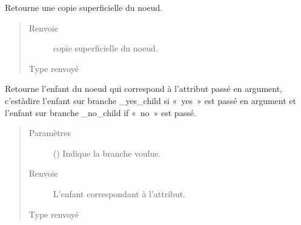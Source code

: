 \documentclass[letterpaper,10pt,french]{sphinxmanual}
\begin{document}
\begin{fulllineitems}
\begin{fulllineitems}
\end{fulllineitems}


\begin{fulllineitems}
\label{\detokenize{index:StrategyTree.Observation.copy}}
Retourne une copie superficielle du noeud.
\begin{quote}\begin{description}
\item[{Renvoie}] \leavevmode
{} \textendash{} copie superficielle du noeud.

\item[{Type renvoyé}] \leavevmode
{\hyperref[\detokenize{index:StrategyTree.Observation}]{}}

\end{description}\end{quote}

\end{fulllineitems}


\begin{fulllineitems}
\label{\detokenize{index:StrategyTree.Observation.get_child_by_attribute}}
Retourne l’enfant du noeud qui correspond à l’attribut passé en
argument, c’est\sphinxhyphen{}à\sphinxhyphen{}dire l’enfant sur branche \_yes\_child si « yes » est
passé en argument et l’enfant sur branche \_no\_child if « no » est passé.
\begin{quote}\begin{description}
\item[{Paramètres}] \leavevmode
{} () \textendash{} Indique la branche voulue.

\item[{Renvoie}] \leavevmode
{} \textendash{} L’enfant correspondant à l’attribut.

\item[{Type renvoyé}] \leavevmode
{\hyperref[\detokenize{index:StrategyTree.NodeST}]{}}


\end{description}
\end{quote}
\end{fulllineitems}
\end{fulllineitems}
\end{document}
